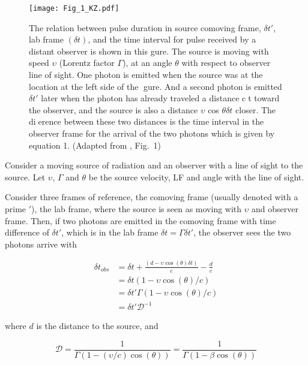 \begin{figure*}[t]
    \centering 
    \texttt{[image: Fig\_1\_KZ.pdf]}
    \caption{
        The relation between pulse duration in source comoving frame, $\delta t'$, lab frame
        $(\delta t)$, and the time interval for pulse received by a distant observer is shown in this
        gure. The source is moving with speed $\upsilon$ (Lorentz factor $\Gamma$), at an angle $\theta$ with
        respect to observer line of sight. One photon is emitted when the source was at the
        location at the left side of the gure. And a second photon is emitted $\delta t'$ later when
        the photon has already traveled a distance ct toward the observer, and the source
        is also a distance $\upsilon$ cos $\theta\delta t$ closer. The dierence between these two distances is the
        time interval in the observer frame for the arrival of the two photons which is given
        by equation 1.
        (Adapted from \citet{Kumar:2014upa}, Fig.~1)
    }
    \label{fig:aafg:theory:sr1}
\end{figure*}

Consider a moving source of radiation and an observer with a line of sight to the source. Let $\upsilon$, $\Gamma$ and $\theta$ be the source velocity, \ac{LF} and angle with the line of sight. 

Consider three frames of reference, the comoving frame (usually denoted with a prime $'$), the lab frame, where the source is seen as moving with $\upsilon$ and observer frame. Then, if two photons are emitted in the comoving frame with time difference of $\delta t'$, which is in the lab frame $\delta t = \Gamma \delta t'$, the observer sees the two photons arrive with 

\begin{eqnarray}
\delta t_{obs} &= \delta t + \frac{(d - \upsilon\cos(\theta) \delta t)}{c} - \frac{d}{c} \\
&= \delta t (1 - \upsilon \cos(\theta) / c) \\
&= \delta t' \Gamma (1 - \upsilon \cos(\theta) / c)\\
&= \delta t' \mathcal{D}^{-1}
\end{eqnarray}

where $d$ is the distance to the source, and 

\begin{equation}
\mathcal{D} = \frac{1}{\Gamma(1 - (\upsilon/c) \cos(\theta))} = \frac{1}{\Gamma(1 - \beta\cos(\theta))}
\end{equation}

